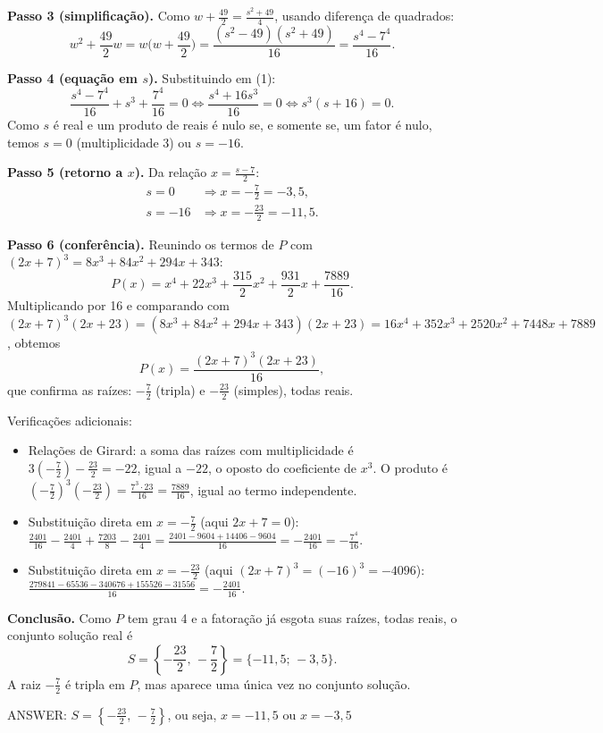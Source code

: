 \documentclass{article}%
\begin{document}
\textbf{Passo 3 (simplificação).} Como $w+\frac{49}{2}=\frac{s^2+49}{4}$, usando diferença de quadrados:
$$w^2+\frac{49}{2}w=w\Big(w+\frac{49}{2}\Big)=\frac{(s^2-49)(s^2+49)}{16}=\frac{s^4-7^4}{16}.$$

\textbf{Passo 4 (equação em $s$).} Substituindo em (1):
$$\frac{s^4-7^4}{16}+s^3+\frac{7^4}{16}=0\iff\frac{s^4+16s^3}{16}=0\iff s^3(s+16)=0.$$
Como $s$ é real e um produto de reais é nulo se, e somente se, um fator é nulo, temos $s=0$ (multiplicidade 3) ou $s=-16$.

\textbf{Passo 5 (retorno a $x$).} Da relação $x=\frac{s-7}{2}$:
\begin{align*}
s=0&\Rightarrow x=-\frac{7}{2}=-3{,}5,\\
s=-16&\Rightarrow x=-\frac{23}{2}=-11{,}5.
\end{align*}

\textbf{Passo 6 (conferência).} Reunindo os termos de $P$ com $(2x+7)^3=8x^3+84x^2+294x+343$:
$$P(x)=x^4+22x^3+\frac{315}{2}x^2+\frac{931}{2}x+\frac{7889}{16}.$$
Multiplicando por 16 e comparando com $(2x+7)^3(2x+23)=(8x^3+84x^2+294x+343)(2x+23)=16x^4+352x^3+2520x^2+7448x+7889$, obtemos
$$P(x)=\frac{(2x+7)^3(2x+23)}{16},$$
que confirma as raízes: $-\frac{7}{2}$ (tripla) e $-\frac{23}{2}$ (simples), todas reais.

Verificações adicionais:
\begin{itemize}
\item Relações de Girard: a soma das raízes com multiplicidade é $3\left(-\frac{7}{2}\right)-\frac{23}{2}=-22$, igual a $-22$, o oposto do coeficiente de $x^3$. O produto é $\left(-\frac{7}{2}\right)^3\left(-\frac{23}{2}\right)=\frac{7^3\cdot 23}{16}=\frac{7889}{16}$, igual ao termo independente.
\item Substituição direta em $x=-\frac{7}{2}$ (aqui $2x+7=0$): $\frac{2401}{16}-\frac{2401}{4}+\frac{7203}{8}-\frac{2401}{4}=\frac{2401-9604+14406-9604}{16}=-\frac{2401}{16}=-\frac{7^4}{16}$.
\item Substituição direta em $x=-\frac{23}{2}$ (aqui $(2x+7)^3=(-16)^3=-4096$): $\frac{279841-65536-340676+155526-31556}{16}=-\frac{2401}{16}$.
\end{itemize}

\textbf{Conclusão.} Como $P$ tem grau 4 e a fatoração já esgota suas raízes, todas reais, o conjunto solução real é
$$S=\left\{-\frac{23}{2},\,-\frac{7}{2}\right\}=\{-11{,}5;\,-3{,}5\}.$$
A raiz $-\frac{7}{2}$ é tripla em $P$, mas aparece uma única vez no conjunto solução.

ANSWER: $S=\left\{-\frac{23}{2},\,-\frac{7}{2}\right\}$, ou seja, $x=-11{,}5$ ou $x=-3{,}5$%
\newpage%
\end{document}
